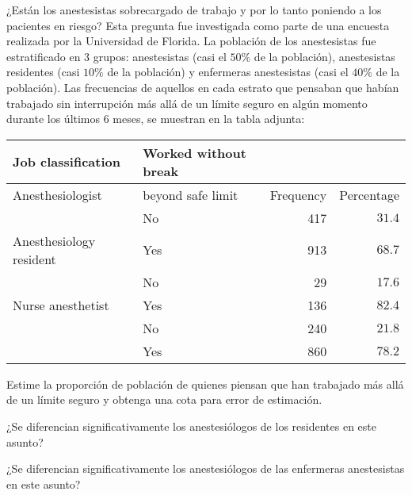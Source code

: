 \addpoints
\question ¿Están los anestesistas sobrecargado de trabajo y por lo tanto poniendo a los pacientes en riesgo? Esta pregunta fue investigada como parte de una encuesta realizada por la Universidad de Florida. La población de los anestesistas fue estratificado en 3 grupos: anestesistas (casi el $50\%$ de la población), anestesistas residentes (casi $10\%$ de la población) y enfermeras anestesistas (casi el $40\%$ de la población). Las frecuencias de aquellos en cada estrato que pensaban que habían
trabajado sin interrupción más allá de un límite seguro en algún momento durante los últimos 6 meses, se muestran en la tabla adjunta:

\begin{center}
\begin{tabular}{llrr}
\hline Job classification & Worked without break & & \\
\hline Anesthesiologist & beyond safe limit & Frequency & Percentage \\
& No & 417 & $31.4$ \\
Anesthesiology resident & Yes & 913 & $68.7$ \\
& No & 29 & $17.6$ \\
Nurse anesthetist & Yes & 136 & $82.4$ \\
& No & 240 & $21.8$ \\
& Yes & 860 & $78.2$ \\
\hline
\end{tabular}
\end{center}
\noaddpoints
\begin{parts}
\item Estime la proporción de población de quienes piensan que han trabajado más allá de un límite seguro y obtenga una cota para error de estimación.
\item ¿Se diferencian significativamente los anestesiólogos de los residentes en este asunto?
\item ¿Se diferencian significativamente los anestesiólogos de las enfermeras anestesistas en este asunto?
\end{parts}